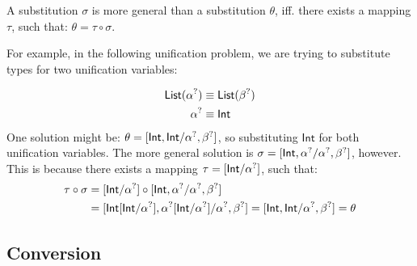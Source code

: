 \documentclass[twoside,12pt,a4paper]{article}
\begin{document}
\begin{definition}\label{more general}
    A substitution $\sigma$ is more general than a substitution $\theta$, iff. there exists a mapping $\tau$, such that: $\theta = \tau \circ \sigma$.
\end{definition}

For example, in the following unification problem, we are trying to substitute types for two unification variables:
\begin{example}
    \begin{align*}
        \mathsf{List}(\alpha^?) &\equiv \mathsf{List}(\beta^?)\\
        \alpha^? &\equiv \mathsf{Int}
    \end{align*}
    One solution might be: $\theta = [\mathsf{Int, Int / \alpha^?, \beta^?}]$, 
so substituting $\mathsf{Int}$ for both unification variables.
The more general solution is $\sigma = [\mathsf{Int,\alpha^? / \alpha^?, \beta^?}]$, however.
This is because there exists a mapping $\tau = [\mathsf{Int / \alpha^?}]$, such that:
\begin{align*}
    \tau \circ \sigma &= [\mathsf{Int / \alpha^?}]\circ[\mathsf{Int,\alpha^? / \alpha^?, \beta^?}] \\
    &= [\mathsf{Int[Int/\alpha^?], \alpha^?[Int/\alpha^?] / \alpha^?, \beta^?]= [Int, Int / \alpha^?, \beta^?]= \theta}
\end{align*}    
\end{example}

\subsection{Conversion}
\end{document}
